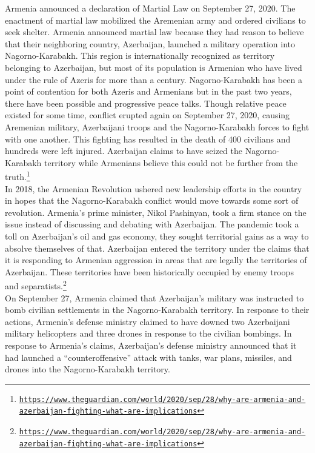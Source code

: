 \documentclass[10pt, letterpaper]{article}
\begin{document}
Armenia announced a declaration of Martial Law on September 27, 2020.
The enactment of martial law mobilized the Aremenian army and ordered
civilians to seek shelter. Armenia announced martial law because they
had reason to believe that their neighboring country, Azerbaijan,
launched a military operation into Nagorno-Karabakh. This region is
internationally recognized as territory belonging to Azerbaijan, but
most of its population is Armenian who have lived under the rule of
Azeris for more than a century. Nagorno-Karabakh has been a point of
contention for both Azeris and Armenians but in the past two years,
there have been possible and progressive peace talks. Though relative
peace existed for some time, conflict erupted again on September 27,
2020, causing Aremenian military, Azerbaijani troops and the
Nagorno-Karabakh forces to fight with one another. This fighting has
resulted in the death of 400 civilians and hundreds were left injured.
Azerbaijan claims to have seized the Nagorno-Karabakh territory while
Armenians believe this could not be further from the truth.\footnote{\texttt{\href{https://www.theguardian.com/world/2020/sep/28/why-are-armenia-and-azerbaijan-fighting-what-are-implications}{{https://www.theguardian.com/world/2020/sep/28/why-are-armenia-and-azerbaijan-fighting-what-are-implications}}}} \\

In 2018, the Armenian Revolution ushered new leadership efforts in the
country in hopes that the Nagorno-Karabakh conflict would move towards
some sort of revolution. Armenia's prime minister, Nikol Pashinyan, took
a firm stance on the issue instead of discussing and debating with
Azerbaijan. The pandemic took a toll on Azerbaijan's oil and gas
economy, they sought territorial gains as a way to absolve themselves of
that. Azerbaijan entered the territory under the claims that it is
responding to Armenian aggression in areas that are legally the
territories of Azerbaijan. These territories have been historically
occupied by enemy troops and separatists.\footnote{\texttt{\href{https://www.theguardian.com/world/2020/sep/28/why-are-armenia-and-azerbaijan-fighting-what-are-implications}{{https://www.theguardian.com/world/2020/sep/28/why-are-armenia-and-azerbaijan-fighting-what-are-implications}}}} \\

On September 27, Armenia claimed that Azerbaijan's military was
instructed to bomb civilian settlements in the Nagorno-Karabakh
territory. In response to their actions, Armenia's defense ministry
claimed to have downed two Azerbaijani military helicopters and three
drones in response to the civilian bombings. In response to Armenia's
claims, Azerbaijan's defense ministry announced that it had launched a
``counteroffensive'' attack with tanks, war plans, missiles, and drones
into the Nagorno-Karabakh territory. \\
\end{document}
